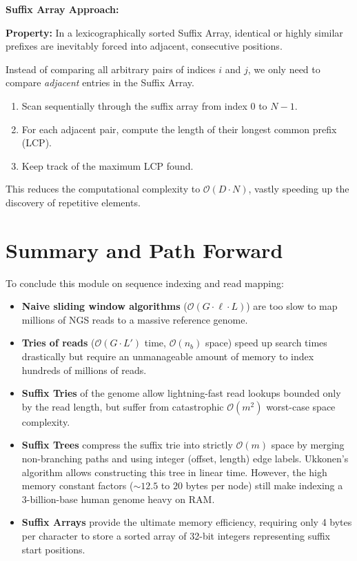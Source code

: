\textbf{Suffix Array Approach:}
\begin{important}
    \textbf{Property:} In a lexicographically sorted Suffix Array, identical or highly similar prefixes are inevitably forced into adjacent, consecutive positions.
\end{important}

Instead of comparing all arbitrary pairs of indices $i$ and $j$, we only need to compare \textit{adjacent} entries in the Suffix Array.
\begin{enumerate}
    \item Scan sequentially through the suffix array from index $0$ to $N-1$.
    \item For each adjacent pair, compute the length of their longest common prefix (LCP).
    \item Keep track of the maximum LCP found.
\end{enumerate}
This reduces the computational complexity to $\mathcal{O}(D \cdot N)$, vastly speeding up the discovery of repetitive elements.

\section{Summary and Path Forward}

To conclude this module on sequence indexing and read mapping:

\begin{itemize}
    \item \textbf{Naive sliding window algorithms} ($\mathcal{O}(G \cdot \ell \cdot L)$) are too slow to map millions of NGS reads to a massive reference genome.
    \item \textbf{Tries of reads} ($\mathcal{O}(G \cdot L')$ time, $\mathcal{O}(n_b)$ space) speed up search times drastically but require an unmanageable amount of memory to index hundreds of millions of reads.
    \item \textbf{Suffix Tries} of the genome allow lightning-fast read lookups bounded only by the read length, but suffer from catastrophic $\mathcal{O}(m^2)$ worst-case space complexity.
    \item \textbf{Suffix Trees} compress the suffix trie into strictly $\mathcal{O}(m)$ space by merging non-branching paths and using integer (offset, length) edge labels. Ukkonen's algorithm allows constructing this tree in linear time. However, the high memory constant factors ($\sim 12.5$ to $20$ bytes per node) still make indexing a 3-billion-base human genome heavy on RAM.
    \item \textbf{Suffix Arrays} provide the ultimate memory efficiency, requiring only 4 bytes per character to store a sorted array of 32-bit integers representing suffix start positions. 
\end{itemize}

